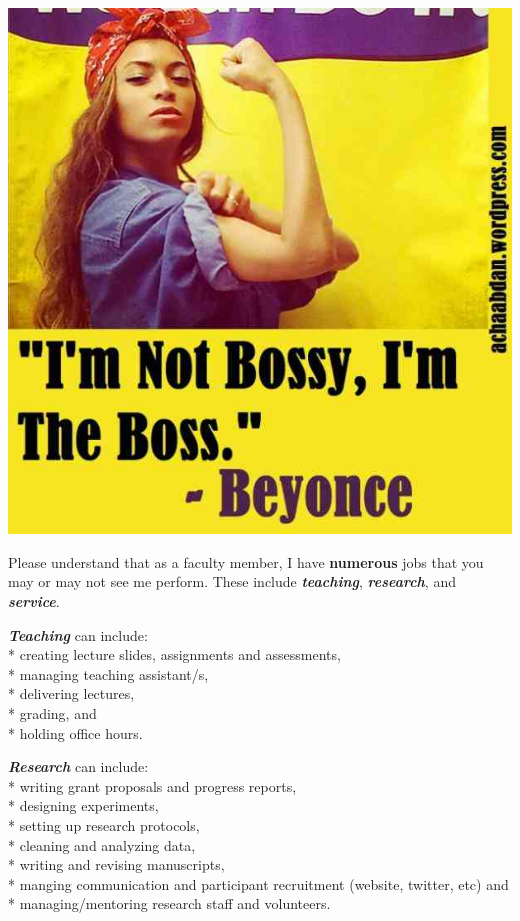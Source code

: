 \documentclass[]{book}
\begin{document}
\includegraphics{images/boss.jpg}

Please understand that as a faculty member, I have \textbf{numerous} jobs that you may or may not see me perform. These include \textbf{\emph{teaching}}, \textbf{\emph{research}}, and \textbf{\emph{service}}.

\textbf{\emph{Teaching}} can include:\\
* creating lecture slides, assignments and assessments,\\
* managing teaching assistant/s,\\
* delivering lectures,\\
* grading, and\\
* holding office hours.

\textbf{\emph{Research}} can include:\\
* writing grant proposals and progress reports,\\
* designing experiments,\\
* setting up research protocols,\\
* cleaning and analyzing data,\\
* writing and revising manuscripts,\\
* manging communication and participant recruitment (website, twitter, etc) and\\
* managing/mentoring research staff and volunteers.
\end{document}
